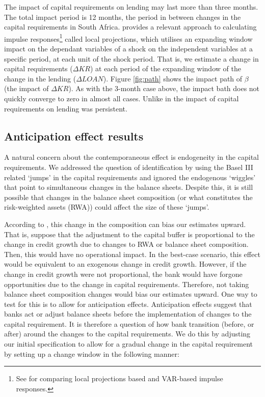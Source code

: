 \documentclass[
  12,
]{article}
\begin{document}
The impact of capital requirements on lending may last more than three months. The total impact period is 12 months, the period in between changes in the capital requirements in South Africa. \citet{jorda2005estimation} provides a relevant approach to calculating impulse responses\footnote{See \citet{jorda2005estimation} for comparing local projections based and VAR-based impulse responses.} called local projections, which utilises an expanding window impact on the dependant variables of a shock on the independent variables at a specific period, at each unit of the shock period. That is, we estimate a change in capital requirements (\(\Delta KR\)) at each period of the expanding window of the change in the lending (\(\Delta LOAN\)). Figure \ref{fig:path} shows the impact path of \(\beta\) (the impact of \(\Delta KR\)). As with the 3-month case above, the impact bath does not quickly converge to zero in almost all cases. Unlike in \citet{fang2020bank} the impact of capital requirements on lending was persistent.

\hypertarget{anticipation-effect-results}{%
\subsection{Anticipation effect results}\label{anticipation-effect-results}}

A natural concern about the contemporaneous effect is endogeneity in the capital requirements. We addressed the question of identification by using the Basel III related `jumps' in the capital requirements and ignored the endogenous `wiggles' that point to simultaneous changes in the balance sheets. Despite this, it is still possible that changes in the balance sheet composition (or what constitutes the risk-weighted assets (RWA)) could affect the size of these `jumps'.

According to \citet{fang2020bank}, this change in the composition can bias our estimates upward. That is, suppose that the adjustment to the capital buffer is proportional to the change in credit growth due to changes to RWA or balance sheet composition. Then, this would have no operational impact. In the best-case scenario, this effect would be equivalent to an exogenous change in credit growth. However, if the change in credit growth were not proportional, the bank would have forgone opportunities due to the change in capital requirements. Therefore, not taking balance sheet composition changes would bias our estimates upward. One way to test for this is to allow for anticipation effects. Anticipation effects suggest that banks act or adjust balance sheets before the implementation of changes to the capital requirement. It is therefore a question of how bank transition (before, or after) around the changes to the capital requirements. We do this by adjusting our initial specification to allow for a gradual change in the capital requirement by setting up a change window in the following manner:
\end{document}

